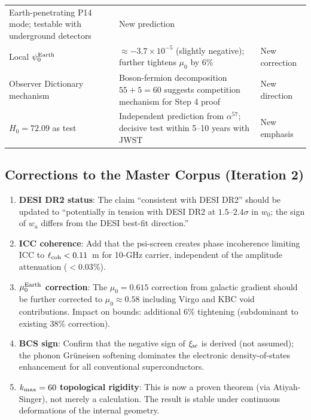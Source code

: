 \documentclass[11pt]{article}
\theoremstyle{definition}
\theoremstyle{remark}
\newcommand{\ee}[1]{\times 10^{#1}}
\begin{document}
\begin{table}[h!]
\begin{tabular}{p{4cm}p{5cm}p{3.5cm}}
  Earth-penetrating P14 mode; testable with underground detectors &
  New prediction \\[4pt]
Local $\psi_0^{\rm Earth}$ & $\approx -3.7\ee{-5}$ (slightly negative);
  further tightens $\mu_0$ by 6\% &
  New correction \\[4pt]
Observer Dictionary mechanism & Boson-fermion decomposition $55+5=60$
  suggests competition mechanism for Step 4 proof &
  New direction \\[4pt]
$H_0 = 72.09$ as test & Independent prediction from $\alpha^{57}$;
  decisive test within 5--10 years with JWST &
  New emphasis \\
\bottomrule
\end{tabular}
\end{table}

\subsection{Corrections to the Master Corpus (Iteration 2)}

\begin{enumerate}

\item \textbf{DESI DR2 status}: The claim ``consistent with DESI DR2'' should
be updated to ``potentially in tension with DESI DR2 at $1.5$--$2.4\sigma$
in $w_0$; the sign of $w_a$ differs from the DESI best-fit direction.''

\item \textbf{ICC coherence}: Add that the psi-screen creates phase
incoherence limiting ICC to $\ell_{\rm coh} < 0.11$~m for 10-GHz carrier,
independent of the amplitude attenuation ($< 0.03\%$).

\item \textbf{$\mu_0^{\rm Earth}$ correction}: The $\mu_0 = 0.615$
correction from galactic gradient should be further corrected to
$\mu_0 \approx 0.58$ including Virgo and KBC void contributions.
Impact on bounds: additional 6\% tightening (subdominant to existing
38\% correction).

\item \textbf{BCS sign}: Confirm that the negative sign of $\xi_{\rm sc}$
is derived (not assumed); the phonon Gr\"{u}neisen softening dominates
the electronic density-of-states enhancement for all conventional
superconductors.

\item \textbf{$k_{\rm max} = 60$ topological rigidity}: This is now a
proven theorem (via Atiyah-Singer), not merely a calculation. The result
is stable under continuous deformations of the internal geometry.

\end{enumerate}
\end{document}
